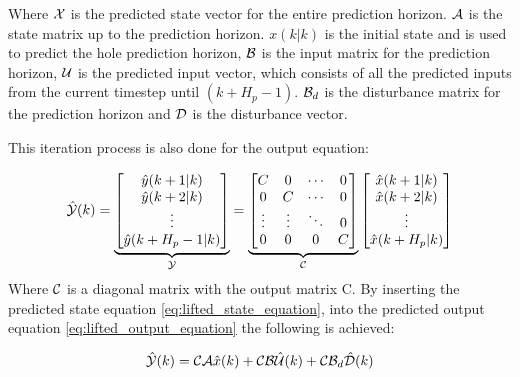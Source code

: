 Where $\CMcal{X}$ is the predicted state vector for the entire prediction horizon. $\CMcal{A}$ is the state matrix up to the prediction horizon. $x(k|k)$ is the initial state and is used to predict the hole prediction horizon, $\CMcal{B}$ is the input matrix for the prediction horizon, $\CMcal{U}$ is the predicted input vector, which consists of all the predicted inputs from the current timestep until $(k+H_p-1)$. $\CMcal{B}_d$ is the disturbance matrix for the prediction horizon and $\CMcal{D}$ is the disturbance vector. 

This iteration process is also done for the output equation:

\begin{equation}\label{eq:lifted_output_equation}
	\hat{\CMcal{Y}}(k)= 
	\underbrace{\begin{bmatrix}
	\hat{y}(k+1|k)\\
	\hat{y}(k+2|k)\\
	\vdots\\
	\hat{y}(k+H_p-1|k)
	\end{bmatrix}}_{\CMcal{Y}}
	= 
	\underbrace{\begin{bmatrix}
	C 		& 0 	&\cdots	& 0\\
	0 		& C 	&\cdots & 0 \\
	\vdots	& \vdots&\ddots & 0\\
	0 		& 0		&0 		& C
	\end{bmatrix}}_{\CMcal{C}}
	  \begin{bmatrix}
	  \hat{x}(k+1|k) 	\\
	  \hat{x}(k+2|k) 	\\
	  \vdots 			\\
	  \hat{x}(k+H_p|k) 	\\
	   \end{bmatrix}
\end{equation}
Where $\CMcal{C}$ is a diagonal matrix with the output matrix C. By inserting the predicted state equation \ref{eq:lifted_state_equation}, into the predicted output equation \ref{eq:lifted_output_equation} the following is achieved:

\begin{equation}\label{eq:output_eq_with_state_eq}
	\hat{\CMcal{Y}}(k) =  \CMcal{C}\CMcal{A}\hat{x}(k) +  \CMcal{C}\CMcal{B}\hat{\CMcal{U}}(k) +\CMcal{C}\CMcal{B}_d\hat{\CMcal{D}}(k)
\end{equation}   

